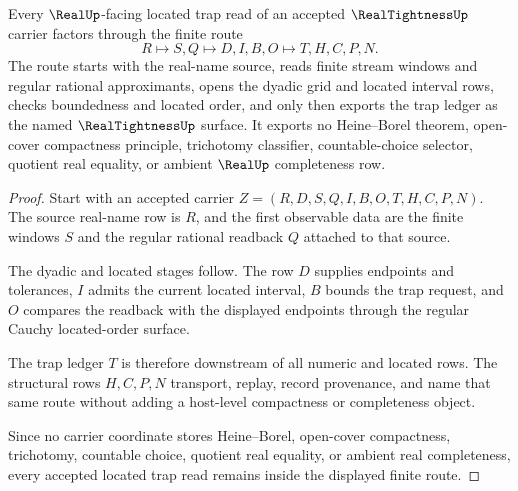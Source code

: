 \begin{theorem}
\label{thm:real-tightness-located-trap-route}
Every $\RealUp$-facing located trap read of an accepted $\RealTightnessUp$ carrier factors through the finite route
$$
R \longmapsto S,Q \longmapsto D,I,B,O \longmapsto T,H,C,P,N .
$$
The route starts with the real-name source, reads finite stream windows and regular rational approximants, opens the dyadic grid and located interval rows, checks boundedness and located order, and only then exports the trap ledger as the named $\RealTightnessUp$ surface. It exports no Heine--Borel theorem, open-cover compactness principle, trichotomy classifier, countable-choice selector, quotient real equality, or ambient $\RealUp$ completeness row.
\end{theorem}
\begin{proof}
Start with an accepted carrier $Z=(R,D,S,Q,I,B,O,T,H,C,P,N)$. The source real-name row is $R$, and the first observable data are the finite windows $S$ and the regular rational readback $Q$ attached to that source.

The dyadic and located stages follow. The row $D$ supplies endpoints and tolerances, $I$ admits the current located interval, $B$ bounds the trap request, and $O$ compares the readback with the displayed endpoints through the regular Cauchy located-order surface.

The trap ledger $T$ is therefore downstream of all numeric and located rows. The structural rows $H,C,P,N$ transport, replay, record provenance, and name that same route without adding a host-level compactness or completeness object.

Since no carrier coordinate stores Heine--Borel, open-cover compactness, trichotomy, countable choice, quotient real equality, or ambient real completeness, every accepted located trap read remains inside the displayed finite route.
\end{proof}



